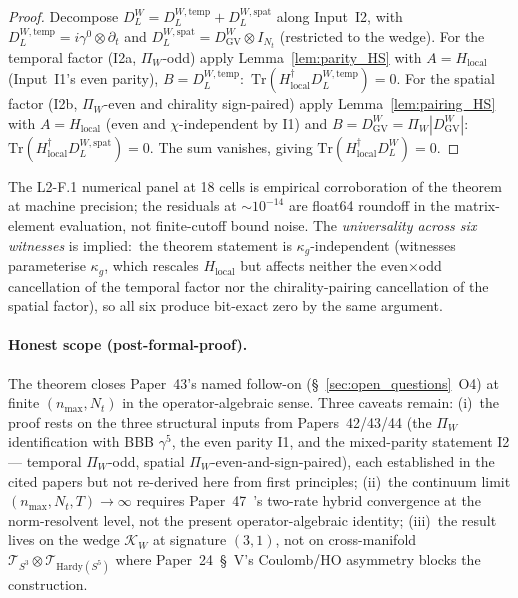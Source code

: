 \documentclass[11pt,a4paper]{article}
\theoremstyle{plain}
\theoremstyle{definition}
\newcommand{\nmax}{n_{\max}}
\newcommand{\Nt}{N_t}
\newcommand{\sthree}{S^{3}}
\newcommand{\Tr}{\mathrm{Tr}}
\newcommand{\DGV}{D_{\mathrm{GV}}}
\newcommand{\DL}{D_{L}}
\begin{document}
\begin{proof}
Decompose $\DL^{W} = \DL^{W,\mathrm{temp}} + \DL^{W,\mathrm{spat}}$ along
Input~I2, with $\DL^{W,\mathrm{temp}} = i\gamma^{0}\otimes\partial_{t}$ and
$\DL^{W,\mathrm{spat}} = \DGV^{W}\otimes I_{\Nt}$ (restricted to the wedge).
For the temporal factor (I2a, $\Pi_{W}$-odd) apply
Lemma~\ref{lem:parity_HS} with $A = H_{\mathrm{local}}$ (Input~I1's even
parity), $B = \DL^{W,\mathrm{temp}}$:\
$\Tr(H_{\mathrm{local}}^{\dagger}\DL^{W,\mathrm{temp}}) = 0$. For the
spatial factor (I2b, $\Pi_{W}$-even and chirality sign-paired) apply
Lemma~\ref{lem:pairing_HS} with $A = H_{\mathrm{local}}$ (even and
$\chi$-independent by I1) and $B = \DGV^{W} = \Pi_{W}|\DGV^{W}|$:\
$\Tr(H_{\mathrm{local}}^{\dagger}\DL^{W,\mathrm{spat}}) = 0$. The sum
vanishes, giving $\Tr(H_{\mathrm{local}}^{\dagger}\DL^{W}) = 0$.
\end{proof}

The L2-F.1 numerical panel at 18 cells is empirical corroboration
of the theorem at machine precision; the residuals at
$\sim 10^{-14}$ are float64 roundoff in the matrix-element
evaluation, not finite-cutoff bound noise. The
\emph{universality across six witnesses} is implied:\ the theorem
statement is $\kappa_{g}$-independent (witnesses parameterise
$\kappa_{g}$, which rescales $H_{\mathrm{local}}$ but affects neither
the even$\times$odd cancellation of the temporal factor nor the
chirality-pairing cancellation of the spatial factor), so all six
produce bit-exact zero by the same argument.

\paragraph{Honest scope (post-formal-proof).}
The theorem closes Paper~43's named follow-on
(\S~\ref{sec:open_questions}~O4) at finite $(\nmax, \Nt)$ in the
operator-algebraic sense. Three caveats remain:
(i)~the proof rests on the three structural inputs from
Papers~42/43/44 (the $\Pi_{W}$ identification with BBB $\gamma^{5}$,
the even parity I1, and the mixed-parity statement I2 --- temporal
$\Pi_{W}$-odd, spatial $\Pi_{W}$-even-and-sign-paired), each established
in the cited papers but not re-derived here from first principles;
(ii)~the continuum limit $(\nmax, \Nt, T) \to \infty$ requires
Paper~47~\cite{paper47}'s two-rate hybrid convergence at the
norm-resolvent level, not the present operator-algebraic identity;
(iii)~the result lives on the wedge $\mathcal{K}_{W}$ at signature
$(3, 1)$, not on cross-manifold $\mathcal{T}_{\sthree} \otimes
\mathcal{T}_{\mathrm{Hardy}(S^{5})}$ where Paper~24~\S~V's
Coulomb/HO asymmetry blocks the construction.
\end{document}
